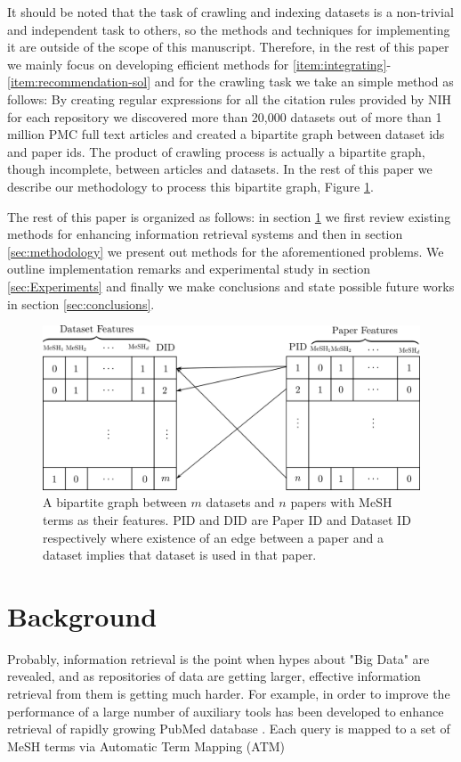 \documentclass[twoside,11pt]{article}
\begin{document}
It should be noted that the task of crawling and indexing datasets is a non-trivial and independent task to others, so the methods and techniques for implementing it are outside of the scope of this manuscript. Therefore, in the rest of this paper we mainly focus on developing efficient methods for \eqref{item:integrating}-\eqref{item:recommendation-sol} and for the crawling task we take an simple method as follows: 
By creating regular expressions for all the citation rules provided by NIH for each repository we discovered more than 20,000 datasets out of more than 1 million PMC full text articles and created a bipartite graph between dataset ids and paper ids. The  product of crawling process is actually a bipartite graph, though incomplete, between articles and datasets. In the rest of this paper we describe our methodology to process this bipartite graph, Figure \ref{fig:bipartite}.

The rest of this paper is organized as follows: in section \ref{sec:background} we first review existing methods for enhancing information retrieval systems and then in section \ref{sec:methodology} we present out methods for the aforementioned problems. We outline implementation remarks and experimental study in section \ref{sec:Experiments} and finally we make conclusions and state possible future works in section \ref{sec:conclusions}.

\begin{figure}\label{fig:bipartite}
\centering
\includegraphics[scale=0.7]{bipartite.png}
\caption{A bipartite graph between $m$ datasets and $n$ papers with MeSH terms as their features. PID and DID are Paper ID and Dataset ID respectively where existence of an edge between a paper and a dataset implies that dataset is used in that paper.}
\end{figure}

\section{Background} \label{sec:background}
Probably, information retrieval is the point when hypes about "Big Data" are revealed, and as repositories of data are getting larger, effective information retrieval from them is getting much harder. For example, in order to improve the performance of a large number of auxiliary tools has been developed to enhance retrieval of rapidly growing PubMed database \cite{pubmed-survey}.
Each query is mapped to a set of MeSH terms via Automatic Term Mapping (ATM) \cite{pubmed-atm}
\end{document}
